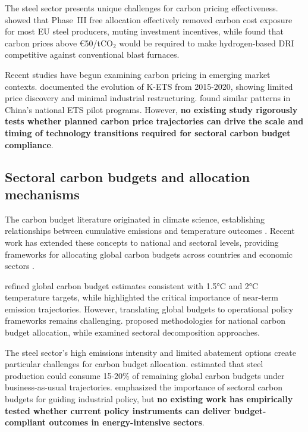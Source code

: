 \documentclass[preprint,1p,authoryear]{elsarticle}
\begin{document}
The steel sector presents unique challenges for carbon pricing effectiveness. \citet{sartor2012benchmark} showed that Phase~III free allocation effectively removed carbon cost exposure for most EU steel producers, muting investment incentives, while \citet{demailly2018european} found that carbon prices above €50/tCO$_2$ would be required to make hydrogen-based DRI competitive against conventional blast furnaces.

Recent studies have begun examining carbon pricing in emerging market contexts. \citet{kim2021kets} documented the evolution of K-ETS from 2015-2020, showing limited price discovery and minimal industrial restructuring. \citet{wang2021carbon} found similar patterns in China's national ETS pilot programs. However, \textbf{no existing study rigorously tests whether planned carbon price trajectories can drive the scale and timing of technology transitions required for sectoral carbon budget compliance}.

\subsection{Sectoral carbon budgets and allocation mechanisms}

The carbon budget literature originated in climate science, establishing relationships between cumulative emissions and temperature outcomes \citep{matthews2009proportionality}. Recent work has extended these concepts to national and sectoral levels, providing frameworks for allocating global carbon budgets across countries \citep{raupach2014sharing} and economic sectors \citep{gasser2018negative}.

\citet{rogelj2019new} refined global carbon budget estimates consistent with 1.5°C and 2°C temperature targets, while \citet{millar2017emission} highlighted the critical importance of near-term emission trajectories. However, translating global budgets to operational policy frameworks remains challenging. \citet{robiou2019national} proposed methodologies for national carbon budget allocation, while \citet{kuramochi2018beyond} examined sectoral decomposition approaches.

The steel sector's high emissions intensity and limited abatement options create particular challenges for carbon budget allocation. \citet{bataille2018role} estimated that steel production could consume 15-20\% of remaining global carbon budgets under business-as-usual trajectories. \citet{Griffin2020} emphasized the importance of sectoral carbon budgets for guiding industrial policy, but \textbf{no existing work has empirically tested whether current policy instruments can deliver budget-compliant outcomes in energy-intensive sectors}.
\end{document}
